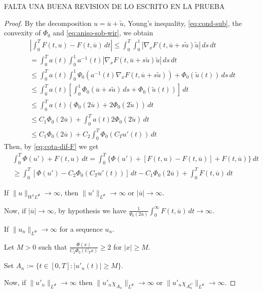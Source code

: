 \documentclass[twoside]{article}
\theoremstyle{remark}
\newcommand{\orlnor}{\|_{L^{\Phi}}}
\newcommand{\lphi}{L^{\Phi}}
\newcommand{\sobnor}{\|_{W^{1}\lphi}}
\renewcommand{\leq}{\leqslant}
\renewcommand{\geq}{\geqslant}
\begin{document}
FALTA UNA BUENA REVISION DE LO ESCRITO EN LA PRUEBA
\begin{proof}
By the decomposition $u=\overline{u}+\tilde{u}$,   Young's inequality, \eqref{eq:cond-sub}, the convexity of $\Phi_0$
and \eqref{eq:aniso-sob-wir},
we obtain
\begin{equation}\label{eq:cota-dif-F}
\begin{split}
&\left|\int_0^T F(t,u)-F(t,\overline{u})\,dt\right|
\leq \int_0^T \int_0^1 |\nabla_x F(t,\overline{u}+s\tilde{u})\tilde{u}|\,ds\,dt
\\
&=\int_0^T a(t) \int_0^1 a^{-1}(t) |\nabla_x F(t,\overline{u}+s\tilde{u})\tilde{u}|\,ds\,dt
\\
&\leq
\int_0^T a(t) \int_0^1 \Psi_0(a^{-1}(t)\nabla_xF(t,\overline{u}+s\tilde{u}))+\Phi_0(\tilde{u}(t))\,ds\,dt
\\
&\leq
\int_0^T a(t)\left[\int_0^1 \Phi_0(\overline{u}+s\tilde{u})\,ds+\Phi_0(\tilde{u}(t))\right]\,dt
\\
&\leq
\int_0^T a(t) (\Phi_0(2\overline{u})+2 \Phi_0(2\tilde{u}))\,dt
\\
&\leq C_1 \Phi_0(2\overline{u})+\int_0^T a(t)2\Phi_0(2 \tilde{u})\,dt
\\
&
\leq C_1 \Phi_0(2\overline {u}) +C_2 \int_0^T \Phi_0 (C_T u'(t))\,dt
\end{split}
\end{equation}
Then, by \eqref{eq:cota-dif-F} we get
\begin{equation}
\begin{split}
&\int_0^T  \Phi(u')+F(t,u)\,dt=
\int_0^T \{\Phi(u')+[F(t,u)-F(t,\overline{u})]+F(t,\overline{u})\}\,dt
\\
&\geq
\int_0^T [\Phi(u')-C_2 \Phi_0(C_T u'(t))]\,dt-C_1\Phi_0(2 \overline{u})+\int_0^T F(t,\overline{u})\,dt
\end{split}
\end{equation}

If $\|u\sobnor\to \infty$, then $\|u'\orlnor \to \infty$ or $|\overline{u}|\to \infty$.

Now, if $|\overline{u}|\to \infty$, by hypothesis we have
$\frac{1}{\Psi_0(2 \overline{u})}\int_0^\infty F(t,\overline{u})\,dt\to \infty$.

If $\|u_n\orlnor \to \infty$ for a sequence $u_n$.

Let $M>0$ such that $\frac{\Phi(x)}{C_2\Phi_0(C_Tx)}\geq 2$ for $|x|\geq M$.

Set $A_n:=\{t\in [0,T]:|u'_n(t)|\geq M\}$.

Now, if $\|u'_n\orlnor\to \infty$ then
$\|u'_n\chi_{A_n}\orlnor\to \infty$ or $\|u'_n \chi_{A_n^C}\orlnor\to \infty$.


\end{proof}
\end{document}
